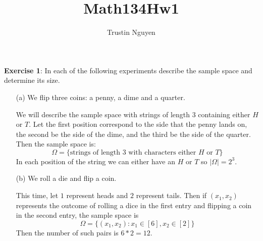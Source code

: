\documentclass{article}
\title{Math134Hw1}
\author{Trustin Nguyen}
\begin{document}
    \maketitle

\reversemarginpar

\textbf{Exercise 1}: In each of the following experiments describe the sample space and determine its size.
    \begin{itemize}
        \item [(a)] We flip three coins: a penny, a dime and a quarter.
            \begin{answer}
                We will describe the sample space with strings of length $3$ containing either $H$ or $T$. Let the first position correspond to the side that the penny lands on, the second be the side of the dime, and the third be the side of the quarter. Then the sample space is:
                    \begin{equation*}
                        \Omega = \{\text{strings of length $3$ with characters either $H$ or $T$}\}
                    \end{equation*}
                In each position of the string we can either have an $H$ or $T$ so $\lvert \Omega \rvert = 2^{3}$.
            \end{answer}

        \item [(b)] We roll a die and flip a coin. 
            \begin{answer}
                This time, let $1$ represent heads and $2$ represent tails. Then if $(x_{1}, x_{2})$ represents the outcome of rolling a dice in the first entry and flipping a coin in the second entry, the sample space is
                    \begin{equation*}
                        \Omega = \{(x_{1}, x_{2}) : x_{1} \in [6], x_{2} \in [2]\}
                    \end{equation*}
                Then the number of such pairs is $6 * 2 = 12$.
            \end{answer}
    \end{itemize}

\newpage
\end{document}
